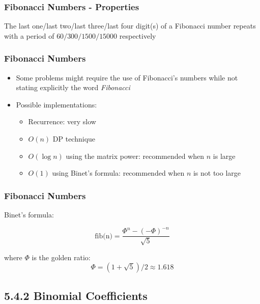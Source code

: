 \documentclass{beamer}
\begin{document}
\begin{frame}[fragile]
\frametitle{Fibonacci Numbers - Properties}

\begin{theorem} \label{pisano}
	The last one/last two/last three/last four digit(s) of a Fibonacci number repeats with a period of $60/300/1500/15000$ respectively
\end{theorem}

\end{frame}

\begin{frame}[fragile]
\frametitle{Fibonacci Numbers}

\begin{itemize}
    \item Some problems might require the use of Fibonacci's numbers while not stating explicitly the word \textit{Fibonacci}
    \item Possible implementations:
    	\begin{itemize}
		    \item Recurrence: very slow
		    \item $O(n)$ DP technique
		    \item $O(\log n)$ using the matrix power: recommended when $n$ is large
		    \item $O(1)$ using Binet's formula: recommended when $n$ is not too large
		\end{itemize}
\end{itemize}

\end{frame}

\begin{frame}[fragile]
\frametitle{Fibonacci Numbers}

Binet's formula: 

\begin{equation*}
    \text{fib(n)} = \frac{\Phi^n - (-\Phi)^{-n}}{\sqrt{5}}
\end{equation*}

where $\Phi$ is the golden ratio: $$\Phi = (1 + \sqrt{5})/2 \approx 1.618$$

\end{frame}


\subsection{5.4.2 Binomial Coefficients}
\end{document}

